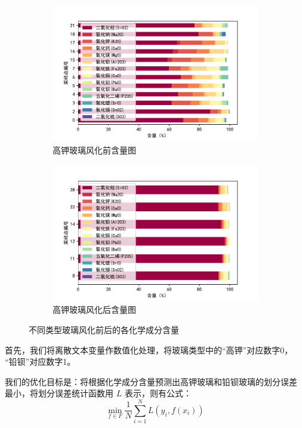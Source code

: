 \documentclass[withoutpreface,bwprint]{cumcmthesis} %
\begin{document}
\begin{figure}[!htb]
    \begin{subfigure}{0.45\textwidth}
        \centering
        \includegraphics[scale=0.45]{高钾无风化.pdf}
        \caption{高钾玻璃风化前含量图}
    \end{subfigure}
    \qquad
    \begin{subfigure}{0.45\textwidth}
        \centering
        \includegraphics[scale=0.45]{高钾风化.pdf}
        \caption{高钾玻璃风化后含量图}
    \end{subfigure}
    \caption{不同类型玻璃风化前后的各化学成分含量}
    \label{fig:all0}
\end{figure}

首先，我们将离散文本变量作数值化处理，将玻璃类型中的“高钾”对应数字0，
“铅钡”对应数字1。

我们的优化目标是：将根据化学成分含量预测出高钾玻璃和铅钡玻璃的划分误差
最小，将划分误差统计函数用 $L$ 表示，则有公式：
\[
    \min_{f\in F}\frac{1}{N}\sum_{i=1}^NL(y_i,f(x_i))
\]
\end{document}
